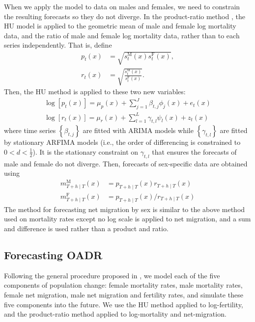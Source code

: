 \documentclass[
  doublespace]{anzsauth}
\begin{document}
When we apply the \citet{HU07} model to data on males and females, we need to constrain the resulting forecasts so they do not diverge. In the product-ratio method \citep{HBY13}, the HU model is applied to the geometric mean of male and female log mortality data, and the ratio of male and female log mortality data, rather than to each series independently. That is, define
\begin{align}
  p_t(x)&=\sqrt{s_{t}^{\text{M}}(x)s_{t}^{\text{F}}(x)}, \label{eq:coherent_1}\\
  r_t(x)&=\sqrt{\frac{s_{t}^{\text{M}}(x)}{s_{t}^{\text{F}}(x)}}. \label{eq:coherent_2}
\end{align}
Then, the HU method is applied to these two new variables:
\begin{align*}
  \log[p_t(x)]=\mu_p(x)+\sum_{j=1}^{J}\beta_{t,j}\phi_j(x)+e_t(x)\\
  \log[r_t(x)]=\mu_r(x)+\sum_{l=1}^{L}\gamma_{t,l}\psi_l(x)+z_t(x)
\end{align*}
where time series \(\left\{\beta_{t,j}\right\}\) are fitted with ARIMA models while \(\left\{\gamma_{t,l}\right\}\) are fitted by stationary ARFIMA models (i.e., the order of differencing is constrained to \(0<d<\frac{1}{2}\)). It is the stationary constraint on \(\gamma_{t,l}\) that ensures the forecasts of male and female do not diverge. Then, forecasts of sex-specific data are obtained using
\begin{align*}
  m_{T+h\mid T}^{\text{M}}(x) & = p_{T+h\mid T}(x)r_{T+h\mid T}(x)\\
  m_{T+h\mid T}^{\text{F}}(x) & = p_{T+h\mid T}(x)/r_{T+h\mid T}(x)
\end{align*}
The method for forecasting net migration by sex is similar to the above method used on mortality rates except no log scale is applied to net migration, and a sum and difference is used rather than a product and ratio.

\hypertarget{forecasting-oadr}{%
\subsection{Forecasting OADR}\label{forecasting-oadr}}

Following the general procedure proposed in \citet{HB08}, we model each of the five components of population change: female mortality rates, male mortality rates, female net migration, male net migration and fertility rates, and simulate these five components into the future. We use the HU method applied to log-fertility, and the product-ratio method applied to log-mortality and net-migration.
\end{document}
